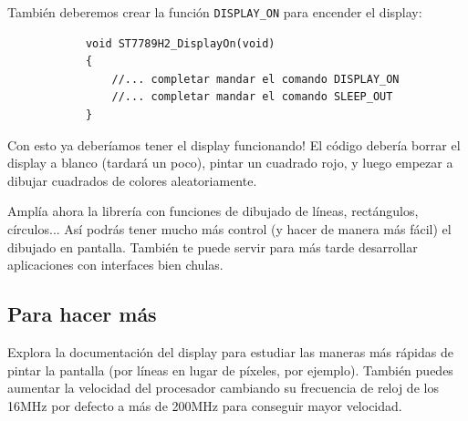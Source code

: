 \documentclass[../main.tex]{subfiles}
\begin{document}
        También deberemos crear la función \texttt{DISPLAY\_ON} para encender el display:

        \begin{lstlisting}
            void ST7789H2_DisplayOn(void)
            {
                //... completar mandar el comando DISPLAY_ON
                //... completar mandar el comando SLEEP_OUT
            }
        \end{lstlisting}

        Con esto ya deberíamos tener el display funcionando! El código debería borrar el display a blanco (tardará un poco), pintar un cuadrado rojo, y luego empezar a dibujar cuadrados de colores aleatoriamente.

        Amplía ahora la librería con funciones de dibujado de líneas, rectángulos, círculos... Así podrás tener mucho más control (y hacer de manera más fácil) el dibujado en pantalla. También te puede servir para más tarde desarrollar aplicaciones con interfaces bien chulas.
    
    \subsection{Para hacer más} 
        
        Explora la documentación del display para estudiar las maneras más rápidas de pintar la pantalla (por líneas en lugar de píxeles, por ejemplo). También puedes aumentar la velocidad del procesador cambiando su frecuencia de reloj de los 16MHz por defecto a más de 200MHz para conseguir mayor velocidad.
\end{document}
